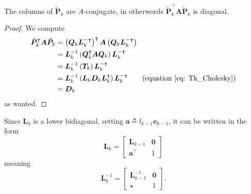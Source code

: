 \begin{lem} \label{lemma: Pk_cols_A_conj}
    The columns of $\tilde{\bm{P}}_k$ are $A$-conjugate, in otherwords $\tilde{\bm{P}}_k^{\intercal} \bm{A} \tilde{\bm{P}}_k$ is diagonal.
\end{lem}

\begin{proof}
    We compute
    \begin{align*}
        \tilde{\bm{P}}_k^{\intercal} \bm{A} \tilde{\bm{P}}_k
         & = \left( \bm{Q}_k \bm{L}_k^{-\intercal} \right)^{\intercal} \bm{A} \left( \bm{Q}_k \bm{L}_k^{-\intercal} \right)                 \\
         & = \bm{L}_k^{-1} \left( \bm{Q}_k^{\intercal} \bm{A} \bm{Q}_k \right) \bm{L}_k^{-\intercal}                                        \\
         & = \bm{L}_k^{-1} \left( \bm{T}_k \right) \bm{L}_k^{-\intercal}                                                                    \\
         & = \bm{L}_k^{-1} \left( \bm{L}_k \bm{D}_k \bm{L}_k^{\intercal} \right) \bm{L}_k^{-\intercal} \tag{equation \ref{eq: Tk_Cholesky}} \\
         & = \bm{D}_k
    \end{align*}
    as wanted.
\end{proof}

Since $\bm{L}_k$ is a lower bidiagonal, setting $\bm{a} \triangleq l_{k-1} \bm{e}_{k-1}$, it can be written in the form
\[
    \bm{L}_k =
    \begin{bmatrix}
        \bm{L}_{k-1}       & \bm{0} \\
        \bm{a}^{\intercal} & 1
    \end{bmatrix}
\]
meaning
\[
    \bm{L}_k^{-1} =
    \begin{bmatrix}
        \bm{L}_{k-1}^{-1} & \bm{0} \\
        \star             & 1
    \end{bmatrix}.
\]

